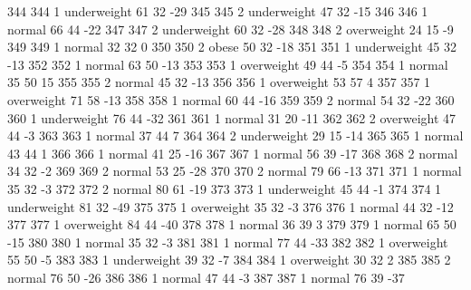 \begin{Schunk}
\begin{Soutput}
344         344   1 underweight  61         32          -29
345         345   2 underweight  47         32          -15
346         346   1      normal  66         44          -22
347         347   2 underweight  60         32          -28
348         348   2  overweight  24         15           -9
349         349   1      normal  32         32            0
350         350   2       obese  50         32          -18
351         351   1 underweight  45         32          -13
352         352   1      normal  63         50          -13
353         353   1  overweight  49         44           -5
354         354   1      normal  35         50           15
355         355   2      normal  45         32          -13
356         356   1  overweight  53         57            4
357         357   1  overweight  71         58          -13
358         358   1      normal  60         44          -16
359         359   2      normal  54         32          -22
360         360   1 underweight  76         44          -32
361         361   1      normal  31         20          -11
362         362   2  overweight  47         44           -3
363         363   1      normal  37         44            7
364         364   2 underweight  29         15          -14
365         365   1      normal  43         44            1
366         366   1      normal  41         25          -16
367         367   1      normal  56         39          -17
368         368   2      normal  34         32           -2
369         369   2      normal  53         25          -28
370         370   2      normal  79         66          -13
371         371   1      normal  35         32           -3
372         372   2      normal  80         61          -19
373         373   1 underweight  45         44           -1
374         374   1 underweight  81         32          -49
375         375   1  overweight  35         32           -3
376         376   1      normal  44         32          -12
377         377   1  overweight  84         44          -40
378         378   1      normal  36         39            3
379         379   1      normal  65         50          -15
380         380   1      normal  35         32           -3
381         381   1      normal  77         44          -33
382         382   1  overweight  55         50           -5
383         383   1 underweight  39         32           -7
384         384   1  overweight  30         32            2
385         385   2      normal  76         50          -26
386         386   1      normal  47         44           -3
387         387   1      normal  76         39          -37

\end{Soutput}
\end{Schunk}
